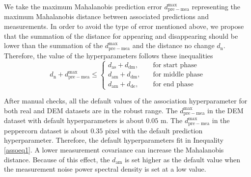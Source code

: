 We take the maximum Mahalanobis prediction error $d_{\mathrm{pre-mea}}^{\mathrm{max}}$ representing the maximum Mahalanobis distance between associated predictions and measurements. In order to avoid the type of error mentioned above, we propose that the summation of the distance for appearing and disappearing should be lower than the summation of the $d_{\mathrm{pre-mea}}^{\mathrm{max}}$ and the distance no change $d_{\mathrm{n}}$. Therefore, the value of the hyperparameters follows these inequalities
\begin{equation}\label{assoeq1}
    d_{\mathrm{n}} + d_{\mathrm{pre-mea}}^{\mathrm{max}} \leqslant 
    \left\{
         \begin{array}{ll}
         d_{\mathrm{as}} + d_{\mathrm{dm}}, \quad&\textrm{for start phase}\\
         d_{\mathrm{am}} + d_{\mathrm{dm}}, \quad&\textrm{for middle phase}\\
         d_{\mathrm{am}} + d_{\mathrm{de}}, \quad&\textrm{for end phase}  
         \end{array}
    \right . 
\end{equation}

After manual checks, all the default values of the association hyperparameter for both real and DEM datasets are in the robust range. The $d_{\mathrm{pre-mea}}^{\mathrm{max}}$ in the DEM dataset with default hyperparameters is about $0.05$ m. The $d_{\mathrm{pre-mea}}^{\mathrm{max}}$ in the peppercorn dataset is about $0.35$ pixel with the default prediction hyperparameter. Therefore, the default hyperparameters fit in  Inequality \eqref{assoeq1}. A lower measurement covariance can increase the Mahalanobis distance. Because of this effect, the $d_{\mathrm{am}}$ is set higher as the default value when the measurement noise power spectral density is set at a low value.

